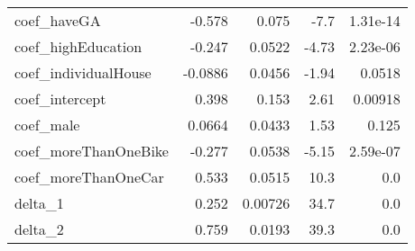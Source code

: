 \begin{tabular}{lrrrr}
coef_haveGA & -0.578 & 0.075 & -7.7 & 1.31e-14 \\
coef_highEducation & -0.247 & 0.0522 & -4.73 & 2.23e-06 \\
coef_individualHouse & -0.0886 & 0.0456 & -1.94 & 0.0518 \\
coef_intercept & 0.398 & 0.153 & 2.61 & 0.00918 \\
coef_male & 0.0664 & 0.0433 & 1.53 & 0.125 \\
coef_moreThanOneBike & -0.277 & 0.0538 & -5.15 & 2.59e-07 \\
coef_moreThanOneCar & 0.533 & 0.0515 & 10.3 & 0.0 \\
delta_1 & 0.252 & 0.00726 & 34.7 & 0.0 \\
delta_2 & 0.759 & 0.0193 & 39.3 & 0.0 \\
\end{tabular}

